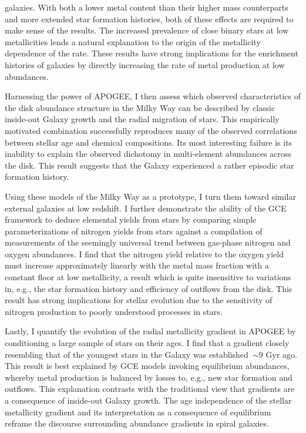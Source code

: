 \documentclass[main.tex]{subfiles}
\begin{document}
\begin{doublespace}
galaxies.
With both a lower metal content than their higher mass counterparts and more
extended star formation histories, both of these effects are required to
make sense of the results.
The increased prevalence of close binary stars at low metallicities lends a
natural explanation to the origin of the metallicity dependence of the rate.
These results have strong implications for the enrichment histories of galaxies
by directly increasing the rate of metal production at low abundances.
\par
Harnessing the power of APOGEE, I then assess which observed characteristics of
the disk abundance structure in the Milky Way can be described by classic
inside-out Galaxy growth and the radial migration of stars.
This empirically motivated combination successfully reproduces many of the
observed correlations between stellar age and chemical compositions.
Its most interesting failure is its inability to explain the observed dichotomy
in multi-element abundances across the disk.
This result suggests that the Galaxy experienced a rather episodic star
formation history.
\par
Using these models of the Milky Way as a prototype, I turn them toward similar
external galaxies at low redshift.
I further demonstrate the ability of the GCE framework to deduce elemental
yields from stars by comparing simple parameterizations of nitrogen yields from
stars against a compilation of measurements of the seemingly universal trend
between gas-phase nitrogen and oxygen abundances.
I find that the nitrogen yield relative to the oxygen yield must increase
approximately linearly with the metal mass fraction with a constant floor at
low metallicity, a result which is quite insensitive to variations in, e.g.,
the star formation history and efficiency of outflows from the disk.
This result has strong implications for stellar evolution due to the sensitivity
of nitrogen production to poorly understood processes in stars.
\par
Lastly, I quantify the evolution of the radial metallicity gradient in APOGEE
by conditioning a large sample of stars on their ages.
I find that a gradient closely resembling that of the youngest stars in the
Galaxy was established~$\sim$9 Gyr ago.
This result is best explained by GCE models invoking equilibrium abundances,
whereby metal production is balanced by losses to, e.g., new star formation and
outflows.
This explanation contrasts with the traditional view that gradients are a
consequence of inside-out Galaxy growth.
The age independence of the stellar metallicity gradient and its interpretation
as a consequence of equilibrium reframe the discourse surrounding abundance
gradients in spiral galaxies.

\end{doublespace}
\end{document}
